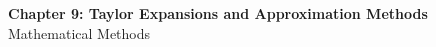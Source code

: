 \documentclass[12pt]{article}
\begin{document}
\begin{center}
  {\LARGE\bfseries Chapter 9: Taylor Expansions and Approximation Methods}\\[0.25em]
  {\large Mathematical Methods}\\[0.15em]
\end{center}

\end{document}
